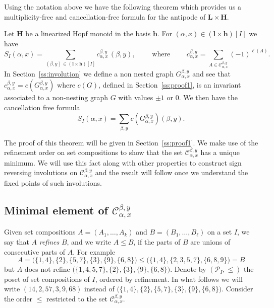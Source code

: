 \documentclass[ALCO,ThmDefs,Unicode,epreuves]{cedram}
\newcommand{\bL}{\mathbf{L}}
\newcommand{\bH}{\mathbf{H}}
\newcommand{\bh}{\mathbf{h}}
\begin{document}
Using the notation above we have the following theorem which provides us a multiplicity-free and cancellation-free formula for the antipode of $\bL\times\bH$. 
\begin{theorem}\label{thm:antiLxP} Let $\bH$ be a linearized Hopf monoid in the basis $\mathbf{h}$. For $(\alpha, x)\in(\mathbf{l}\times\bh)[I]$ we have
$$ S_I(\alpha,x) = \sum_{(\beta,y)\in (\mathbf{l}\times\bh)[I]} c_{\alpha,x}^{\beta,y} \,(\beta,y),
\qquad\text{ where }\qquad
 c_{\alpha,x}^{\beta,y}=\sum_{A\in \mathcal{C}_{\alpha,x}^{\beta,y}} (-1)^{\ell(A)}.$$
 In Section~\ref{ss:involution} we define a non nested graph $G_{\alpha,x}^{\beta,y}$ and see that $c_{\alpha,x}^{\beta,y}=c(G_{\alpha,x}^{\beta,y})$ where $c(G)$, defined in Section~\ref{ss:proof1}, is an invariant associated to a non-nesting graph $G$
 with values $\pm1 \text{ or } 0$. We then have the cancellation free formula
 \begin{equation}\label{eq:thm1}
 S_I(\alpha,x) = \sum_{\beta, y} c(G_{\alpha,x}^{\beta,y}) (\beta,y).
\end{equation}
\end{theorem}

The proof of this theorem will be given in Section~\ref{ss:proof1}. We make use of the refinement order on set compositions to show that the set $\mathcal{C}_{\alpha,x}^{\beta,y}$ has a unique minimum. We will use this fact along with other properties to construct sign reversing involutions on $\mathcal{C}_{\alpha,x}^{\beta,y}$ and the result will follow once we understand the fixed points of such involutions.

\subsection{Minimal element of \texorpdfstring{$\mathcal{C}_{\alpha,x}^{\beta,y}$}{C alpha,x beta,y}}\label{ss:refinementonC}
Given set compositions $A=(A_1,\ldots,A_k)$ and $B=(B_1,\ldots,B_\ell)$ on a set $I$, 
we say that $A$ \emph{refines} $B$, and we write $A\le B$, if the parts of $B$ are unions of consecutive parts of $A$. For example
 $$A = \big(\{1,4\},\{2\},\{5,7\},\{3\},\{9\},\{6,8\}\big) \le \big(\{1,4\},\{2,3,5,7\},\{6,8,9\}\big)=B$$
but $A$ does not refine $\big(\{1,4,5,7\},\{2\},\{3\},\{9\},\{6,8\}\big)$. Denote by $(\mathcal{P}_I,\leq)$ the poset of set compositions of $I$, ordered by refinement.
In what follows we will write $(14,2,57,3,9,68)$ instead of $\big(\{1,4\},\{2\},\{5,7\},\{3\},\{9\},\{6,8\}\big)$. Consider the order $\le$ restricted to the set $\mathcal{C}_{\alpha,x}^{\beta,y}$.
\end{document}
